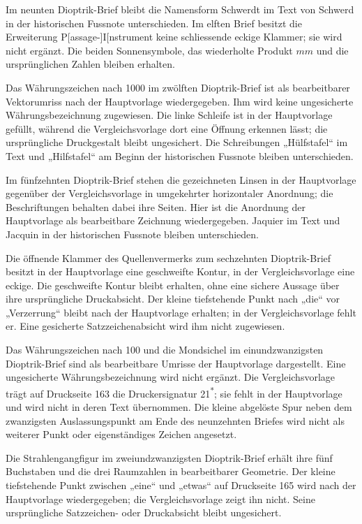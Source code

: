 Im neunten Dioptrik-Brief bleibt die Namensform Schwerdt im Text von Schwerd in der historischen Fussnote unterschieden. Im elften Brief besitzt die Erweiterung P[assage-]I[nstrument keine schliessende eckige Klammer; sie wird nicht ergänzt. Die beiden Sonnensymbole, das wiederholte Produkt $mm$ und die ursprünglichen Zahlen bleiben erhalten.

Das Währungszeichen nach 1000 im zwölften Dioptrik-Brief ist als bearbeitbarer Vektorumriss nach der Hauptvorlage wiedergegeben. Ihm wird keine ungesicherte Währungsbezeichnung zugewiesen. Die linke Schleife ist in der Hauptvorlage gefüllt, während die Vergleichsvorlage dort eine Öffnung erkennen lässt; die ursprüngliche Druckgestalt bleibt ungesichert. Die Schreibungen „Hülfstafel“ im Text und „Hilfstafel“ am Beginn der historischen Fussnote bleiben unterschieden.

Im fünfzehnten Dioptrik-Brief stehen die gezeichneten Linsen in der Hauptvorlage gegenüber der Vergleichsvorlage in umgekehrter horizontaler Anordnung; die Beschriftungen behalten dabei ihre Seiten. Hier ist die Anordnung der Hauptvorlage als bearbeitbare Zeichnung wiedergegeben. Jaquier im Text und Jacquin in der historischen Fussnote bleiben unterschieden.

Die öffnende Klammer des Quellenvermerks zum sechzehnten Dioptrik-Brief besitzt in der Hauptvorlage eine geschweifte Kontur, in der Vergleichsvorlage eine eckige. Die geschweifte Kontur bleibt erhalten, ohne eine sichere Aussage über ihre ursprüngliche Druckabsicht. Der kleine tiefstehende Punkt nach „die“ vor „Verzerrung“ bleibt nach der Hauptvorlage erhalten; in der Vergleichsvorlage fehlt er. Eine gesicherte Satzzeichenabsicht wird ihm nicht zugewiesen.

Das Währungszeichen nach 100 und die Mondsichel im einundzwanzigsten Dioptrik-Brief sind als bearbeitbare Umrisse der Hauptvorlage dargestellt. Eine ungesicherte Währungsbezeichnung wird nicht ergänzt. Die Vergleichsvorlage trägt auf Druckseite 163 die Druckersignatur 21\textsuperscript{*}; sie fehlt in der Hauptvorlage und wird nicht in deren Text übernommen. Die kleine abgelöste Spur neben dem zwanzigsten Auslassungspunkt am Ende des neunzehnten Briefes wird nicht als weiterer Punkt oder eigenständiges Zeichen angesetzt.

Die Strahlengangfigur im zweiundzwanzigsten Dioptrik-Brief erhält ihre fünf Buchstaben und die drei Raumzahlen in bearbeitbarer Geometrie. Der kleine tiefstehende Punkt zwischen „eine“ und „etwas“ auf Druckseite 165 wird nach der Hauptvorlage wiedergegeben; die Vergleichsvorlage zeigt ihn nicht. Seine ursprüngliche Satzzeichen- oder Druckabsicht bleibt ungesichert.

